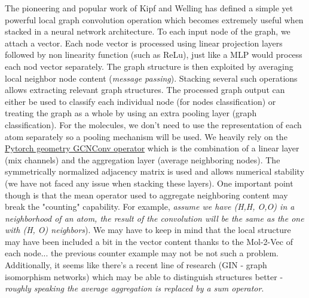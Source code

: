 The pioneering and popular work of Kipf and Welling \cite{kipfwellinggcn} has defined a simple yet powerful local graph convolution operation which becomes extremely useful when stacked in a neural network architecture. To each input node of the graph, we attach a vector. Each node vector is processed using linear projection layers followed by non linearity function (such as ReLu), just like a MLP would process each nod vector separately. The graph structure is then exploited by averaging local neighbor node content (\textit{message passing}). Stacking several such operations allows extracting relevant graph structures. The processed graph output can either be used to classify each individual node (for nodes classification) or treating the graph as a whole by using an extra pooling layer (graph classification). For the molecules, we don't need to use the representation of each atom separately so a pooling mechanism will be used. We heavily rely on the \href{https://pytorch-geometric.readthedocs.io/en/latest/generated/torch_geometric.nn.conv.GCNConv.html}{Pytorch geometry GCNConv operator} which is the combination of a linear layer (mix channels) and the aggregation layer (average neighboring nodes). The symmetrically normalized adjacency matrix is used and allows numerical stability (we have not faced any issue when stacking these layers). One important point though is that the mean operator used to aggregate neighboring content may break the "counting" capability. For example, \textit{assume we have (H,H, O,O) in a neighborhood of an atom, the result of the convolution will be the same as the one with (H, O) neighbors}). We may have to keep in mind that the local structure may have been included a bit in the vector content thanks to the Mol-2-Vec \cite{mol2vec} of each node... the previous counter example may not be not such a problem. Additionally, it seems like there's a recent line of research (GIN  \cite{gin_isomorphism} - graph isomorphism networks) which may be able to distinguish structures better - \textit{roughly speaking the average aggregation is replaced by a sum operator}.
